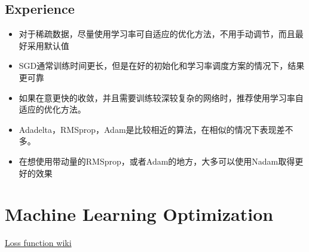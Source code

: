 \documentclass[hyperref, UTF-8]{ctexart}
\begin{document}
\subsection{Experience}
\begin{itemize}
\item 对于稀疏数据，尽量使用学习率可自适应的优化方法，不用手动调节，而且最好采用默认值
\item SGD通常训练时间更长，但是在好的初始化和学习率调度方案的情况下，结果更可靠
\item 如果在意更快的收敛，并且需要训练较深较复杂的网络时，推荐使用学习率自适应的优化方法。
\item Adadelta，RMSprop，Adam是比较相近的算法，在相似的情况下表现差不多。
\item 在想使用带动量的RMSprop，或者Adam的地方，大多可以使用Nadam取得更好的效果
\end{itemize}
\section{Machine Learning Optimization}



\begin{thebibliography}{99}
 \href{https://en.wikipedia.org/wiki/Loss_function}{Loss function wiki}
\end{thebibliography}
\end{document}
